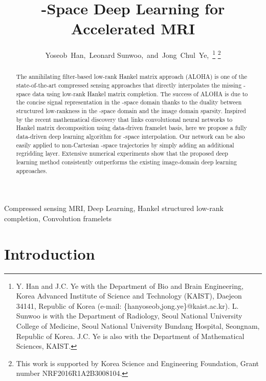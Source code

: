 \documentclass[10pt,journal]{IEEEtran}
\newcommand{\0}{{\boldsymbol{0}}}
\begin{document}
\title{ -Space   Deep Learning for Accelerated MRI }
\date{\vspace{-4ex}}

\author{Yoseob~Han,~Leonard Sunwoo,~and~Jong~Chul~Ye,~\thanks{Y. Han and J.C. Ye with the Department of Bio and Brain Engineering, Korea Advanced Institute of Science and Technology (KAIST), 
		Daejeon 34141, Republic of Korea (e-mail: \{hanyoseob,jong.ye\}@kaist.ac.kr). L. Sunwoo is with the Department of Radiology, Seoul National University College of Medicine, Seoul National University Bundang Hospital, Seongnam, Republic of Korea.
		J.C. Ye is also with the Department of Mathematical Sciences, KAIST.} 
\thanks{This work is supported by Korea Science and Engineering Foundation, Grant
		number NRF2016R1A2B3008104.}}




\maketitle

\begin{abstract}
The annihilating filter-based low-rank Hankel matrix approach (ALOHA) is one of the state-of-the-art compressed sensing approaches that directly interpolates the missing -space data using low-rank Hankel matrix completion. The success of ALOHA is due to the concise signal representation in the -space domain thanks to the duality between structured low-rankness in the -space domain and the image domain sparsity. Inspired by the recent mathematical discovery  that links convolutional neural networks to Hankel matrix decomposition using data-driven framelet basis,
here we  propose  a fully data-driven  deep learning algorithm for -space interpolation. Our network can be also easily applied to non-Cartesian -space trajectories by simply adding an additional regridding layer. Extensive numerical experiments show that the proposed deep learning method consistently outperforms  the existing image-domain deep learning approaches.
\end{abstract}

\begin{IEEEkeywords}
Compressed sensing MRI,  Deep Learning,  Hankel structured low-rank completion,  Convolution framelets
\end{IEEEkeywords}


\IEEEpeerreviewmaketitle


\section{Introduction}
\label{sec:introduction}
\end{document}
